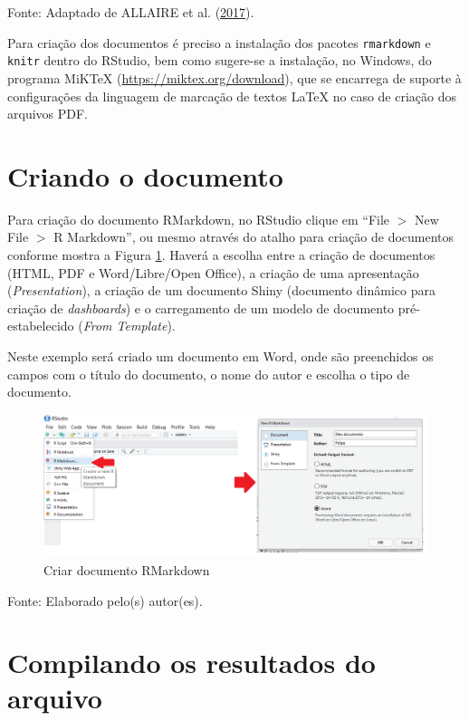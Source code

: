 \documentclass[12pt,brazil,oneside]{book}
\begin{document}
Fonte: Adaptado de ALLAIRE et al. (\protect\hyperlink{ref-R-rmarkdown}{2017}).

Para criação dos documentos é preciso a instalação dos pacotes \texttt{rmarkdown} e \texttt{knitr} dentro do RStudio, bem como sugere-se a instalação, no Windows, do programa MiKTeX (\url{https://miktex.org/download}), que se encarrega de suporte à configurações da linguagem de marcação de textos LaTeX no caso de criação dos arquivos PDF.

\hypertarget{criando-o-documento}{%
\section{Criando o documento}\label{criando-o-documento}}

Para criação do documento RMarkdown, no RStudio clique em ``File \(>\) New File \(>\) R Markdown'', ou mesmo através do atalho para criação de documentos conforme mostra a Figura \ref{fig:criararq1}. Haverá a escolha entre a criação de documentos (HTML, PDF e Word/Libre/Open Office), a criação de uma apresentação (\emph{Presentation}), a criação de um documento Shiny (documento dinâmico para criação de \emph{dashboards}) e o carregamento de um modelo de documento pré-estabelecido (\emph{From Template}).

Neste exemplo será criado um documento em Word, onde são preenchidos os campos com o título do documento, o nome do autor e escolha o tipo de documento.

\begin{figure}[H]

{\centering \includegraphics[width=0.8\linewidth]{criararq1} 

}

\caption{Criar documento RMarkdown}\label{fig:criararq1}
\end{figure}

Fonte: Elaborado pelo(s) autor(es).

\hypertarget{compilando-os-resultados-do-arquivo}{%
\section{Compilando os resultados do arquivo}\label{compilando-os-resultados-do-arquivo}}
\end{document}
